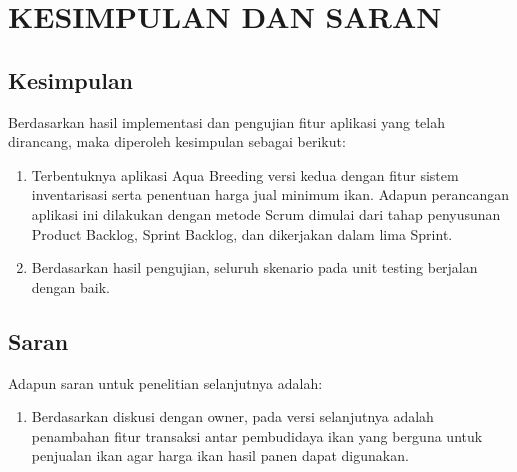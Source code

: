 
\chapter{KESIMPULAN DAN SARAN}

\section{Kesimpulan}
Berdasarkan hasil implementasi dan pengujian fitur aplikasi yang telah dirancang, maka diperoleh kesimpulan sebagai berikut:

\begin{enumerate}
	\item Terbentuknya aplikasi Aqua Breeding versi kedua dengan fitur sistem inventarisasi serta penentuan harga jual minimum ikan. Adapun perancangan aplikasi ini dilakukan dengan metode Scrum dimulai dari tahap penyusunan Product Backlog, Sprint Backlog, dan dikerjakan dalam lima Sprint.
	\item Berdasarkan hasil pengujian, seluruh skenario pada unit testing berjalan dengan baik.
\end{enumerate}

\section{Saran}
Adapun saran untuk penelitian selanjutnya adalah:
\begin{enumerate} 
	\item Berdasarkan diskusi dengan owner, pada versi selanjutnya adalah penambahan fitur transaksi antar pembudidaya ikan yang berguna untuk penjualan ikan agar harga ikan hasil panen dapat digunakan.
\end{enumerate}
\begin{comment}

\end{comment}